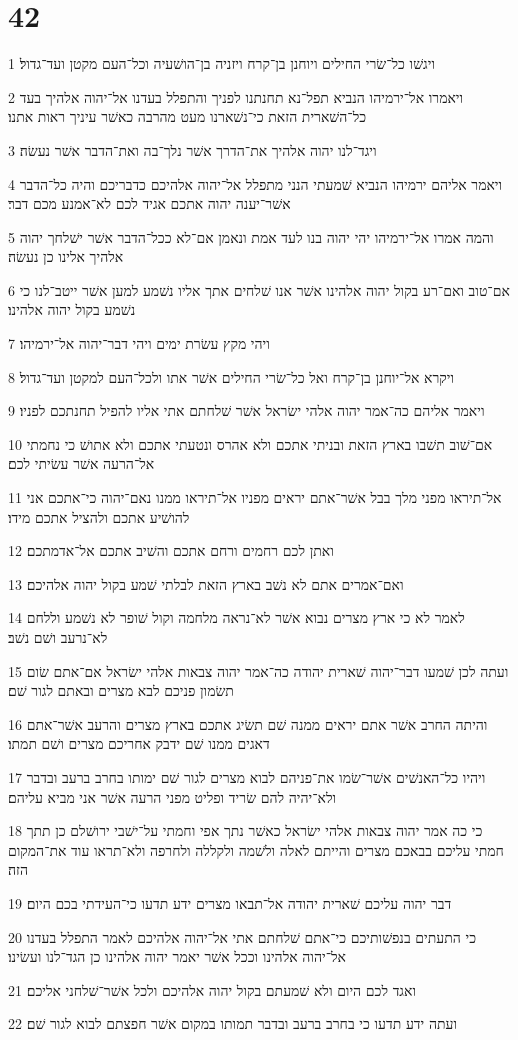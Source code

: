 \chapter{42}

\par 1 ויגשׁו כל־שׂרי החילים ויוחנן בן־קרח ויזניה בן־הושׁעיה וכל־העם מקטן ועד־גדול׃
\par 2 ויאמרו אל־ירמיהו הנביא תפל־נא תחנתנו לפניך והתפלל בעדנו אל־יהוה אלהיך בעד כל־השׁארית הזאת כי־נשׁארנו מעט מהרבה כאשׁר עיניך ראות אתנו׃
\par 3 ויגד־לנו יהוה אלהיך את־הדרך אשׁר נלך־בה ואת־הדבר אשׁר נעשׂה׃
\par 4 ויאמר אליהם ירמיהו הנביא שׁמעתי הנני מתפלל אל־יהוה אלהיכם כדבריכם והיה כל־הדבר אשׁר־יענה יהוה אתכם אגיד לכם לא־אמנע מכם דבר׃
\par 5 והמה אמרו אל־ירמיהו יהי יהוה בנו לעד אמת ונאמן אם־לא ככל־הדבר אשׁר ישׁלחך יהוה אלהיך אלינו כן נעשׂה׃
\par 6 אם־טוב ואם־רע בקול יהוה אלהינו אשׁר אנו שׁלחים אתך אליו נשׁמע למען אשׁר ייטב־לנו כי נשׁמע בקול יהוה אלהינו׃
\par 7 ויהי מקץ עשׂרת ימים ויהי דבר־יהוה אל־ירמיהו׃
\par 8 ויקרא אל־יוחנן בן־קרח ואל כל־שׂרי החילים אשׁר אתו ולכל־העם למקטן ועד־גדול׃
\par 9 ויאמר אליהם כה־אמר יהוה אלהי ישׂראל אשׁר שׁלחתם אתי אליו להפיל תחנתכם לפניו׃
\par 10 אם־שׁוב תשׁבו בארץ הזאת ובניתי אתכם ולא אהרס ונטעתי אתכם ולא אתושׁ כי נחמתי אל־הרעה אשׁר עשׂיתי לכם׃
\par 11 אל־תיראו מפני מלך בבל אשׁר־אתם יראים מפניו אל־תיראו ממנו נאם־יהוה כי־אתכם אני להושׁיע אתכם ולהציל אתכם מידו׃
\par 12 ואתן לכם רחמים ורחם אתכם והשׁיב אתכם אל־אדמתכם׃
\par 13 ואם־אמרים אתם לא נשׁב בארץ הזאת לבלתי שׁמע בקול יהוה אלהיכם׃
\par 14 לאמר לא כי ארץ מצרים נבוא אשׁר לא־נראה מלחמה וקול שׁופר לא נשׁמע וללחם לא־נרעב ושׁם נשׁב׃
\par 15 ועתה לכן שׁמעו דבר־יהוה שׁארית יהודה כה־אמר יהוה צבאות אלהי ישׂראל אם־אתם שׂום תשׂמון פניכם לבא מצרים ובאתם לגור שׁם׃
\par 16 והיתה החרב אשׁר אתם יראים ממנה שׁם תשׂיג אתכם בארץ מצרים והרעב אשׁר־אתם דאגים ממנו שׁם ידבק אחריכם מצרים ושׁם תמתו׃
\par 17 ויהיו כל־האנשׁים אשׁר־שׂמו את־פניהם לבוא מצרים לגור שׁם ימותו בחרב ברעב ובדבר ולא־יהיה להם שׂריד ופליט מפני הרעה אשׁר אני מביא עליהם׃
\par 18 כי כה אמר יהוה צבאות אלהי ישׂראל כאשׁר נתך אפי וחמתי על־ישׁבי ירושׁלם כן תתך חמתי עליכם בבאכם מצרים והייתם לאלה ולשׁמה ולקללה ולחרפה ולא־תראו עוד את־המקום הזה׃
\par 19 דבר יהוה עליכם שׁארית יהודה אל־תבאו מצרים ידע תדעו כי־העידתי בכם היום׃
\par 20 כי התעתים בנפשׁותיכם כי־אתם שׁלחתם אתי אל־יהוה אלהיכם לאמר התפלל בעדנו אל־יהוה אלהינו וככל אשׁר יאמר יהוה אלהינו כן הגד־לנו ועשׂינו׃
\par 21 ואגד לכם היום ולא שׁמעתם בקול יהוה אלהיכם ולכל אשׁר־שׁלחני אליכם׃
\par 22 ועתה ידע תדעו כי בחרב ברעב ובדבר תמותו במקום אשׁר חפצתם לבוא לגור שׁם׃

